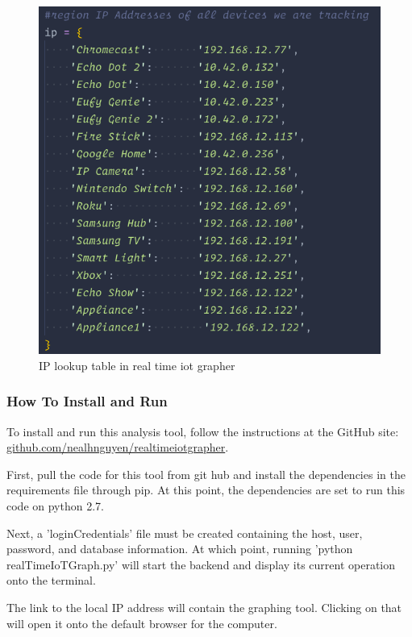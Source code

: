 \begin{figure}[H]
    \centering
    \includegraphics[width=1\textwidth]{figures/ipLookup.png}
    \caption{IP lookup table in real time iot grapher}
    \label{fig:ipLookup}
\end{figure}

\subsubsection{How To Install and Run}
To install and run this analysis tool, follow the instructions at the GitHub site:   \href{https://github.com/nealhnguyen/RealTimeIoTGrapher}{github.com/nealhnguyen/realtimeiotgrapher}.

First, pull the code for this tool from git hub and install the dependencies in the requirements file through pip. At this point, the dependencies are set to run this code on python 2.7.

Next, a 'loginCredentials' file must be created containing the host, user, password, and database information. At which point, running 'python realTimeIoTGraph.py' will start the backend and display its current operation onto the terminal.

The link to the local IP address will contain the graphing tool. Clicking on that will open it onto the default browser for the computer.

